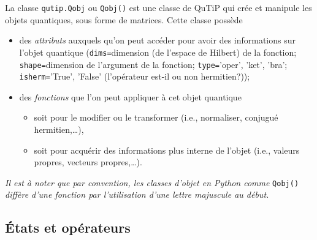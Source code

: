 La classe \texttt{qutip.Qobj} ou \texttt{Qobj()} est une classe de QuTiP qui 
crée et manipule les objets quantiques, sous forme de matrices. Cette classe 
possède 
\begin{itemize}
 \item des \emph{attributs} auxquels qu'on peut accéder pour avoir des 
informations sur l'objet quantique (\texttt{dims=}dimension (de l'espace de 
Hilbert) de la fonction; \texttt{shape=}dimension de l'argument de la fonction; 
\texttt{type=}'oper', 'ket', 'bra'; \texttt{isherm=}'True', 'False' (l'opérateur 
est-il ou non hermitien?));

\item des \emph{fonctions} que l'on peut appliquer à cet objet quantique  
\begin{itemize}
\item soit pour le modifier ou le transformer (i.e., normaliser, conjugué 
hermitien,\ldots), 
\item soit pour acquérir des informations plus interne de l'objet (i.e., 
valeurs propres, vecteurs propres,\ldots).                                  
\end{itemize}

\end{itemize}

\emph{Il est à noter que par convention, les classes d'objet en Python comme} 
\texttt{Qobj()} \emph{diffère d'une fonction par l'utilisation d'une lettre 
majuscule au début.}

\subsection{États et opérateurs}

